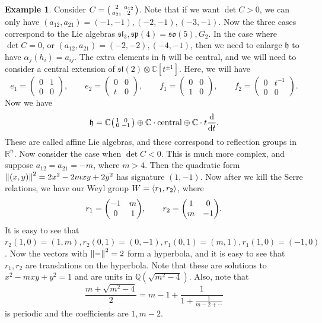 \documentclass[leqno, openany]{memoir}
\theoremstyle{definition}
\newtheorem{exm}[thm]{Example}
\theoremstyle{remark}
\theoremstyle{plain}
\theoremstyle{definition}
\theoremstyle{remark}
\newcommand{\R}{\mathbb{R}}
\newcommand{\C}{\mathbb{C}}
\newcommand{\Q}{\mathbb{Q}}
\newcommand{\mf}[1]{\mathfrak{#1}}
\begin{document}
\begin{exm} Consider $C = \begin{psmallmatrix} 2 & a_{12} \\ a_{21} & 2
\end{psmallmatrix}$. Note that if we want $\det C > 0$, we can only have
$(a_{12}, a_{21}) = (-1,-1), (-2,-1), (-3,-1)$. Now the three cases correspond
to the Lie algebras $\mf{sl}_3, \mf{sp}(4) = \mf{so}(5), G_2$. In the case
where $\det C = 0$, or $(a_{12}, a_{21}) = (-2,-2), (-4,-1)$, then we need to
enlarge $\mf{h}$ to have $\alpha_j(h_i) = a_{ij}$. The extra elements in
$\mf{h}$ will be central, and we will need to consider a central extension of
$\mf{sl}(2) \otimes \C[t^{\pm 1}]$. Here, we will have \[ e_1 = \begin{pmatrix}
    0 & 1 \\ 0 & 0 \end{pmatrix}, \qquad e_2 = \begin{pmatrix} 0 & 0 \\ t & 0
    \end{pmatrix}, \qquad f_1 = \begin{pmatrix} 0 & 0 \\ 1 & 0 \end{pmatrix},
    \qquad f_2 = \begin{pmatrix} 0 & t^{-1} \\ 0 & 0 \end{pmatrix}. \] Now we
    have \[ \mf{h} = \C \begin{psmallmatrix} 1 & 0 \\ 0 & -1 \end{psmallmatrix}
\oplus \C \cdot \text{central} \oplus \C \cdot t \dv{t}. \] These are called
affine Lie algebras, and these correspond to reflection groups in $\R^n$. Now
consider the case when $\det C < 0$. This is much more complex, and suppose
$a_{12} = a_{21} = -m$, where $m>4$. Then the quadratic form $\norm{(x,y)}^2 =
2x^2 - 2mxy + 2y^2$ has signature $(1,-1)$. Now after we kill the Serre
relations, we have our Weyl group $W = \ev{r_1, r_2}$, where \[ r_1 = \mqty(-1
& m \\ 0 & 1), \qquad r_2 = \mqty(1 & 0 \\ m & -1). \] It is easy to see that
$r_2 (1,0) = (1,m), r_2 (0,1) = (0,-1), r_1(0,1) = (m,1), r_1(1,0) = (-1,0)$.
Now the vectors with $\norm{-}^2 = 2$ form a hyperbola, and it is easy to see
that $r_1, r_2$ are translations on the hyperbola. Note that these are
solutions to $x^2 - mxy + y^2 = 1$ and are units in $\Q(\sqrt{m^2-4})$. Also,
note that \[ \frac{m+\sqrt{m^2-4}}{2} = m - 1 + \frac{1}{1 + \frac{1}{m-2 +
\cdots}} \] is periodic and the coefficients are $1, m-2$. 


\end{exm}
\end{document}
